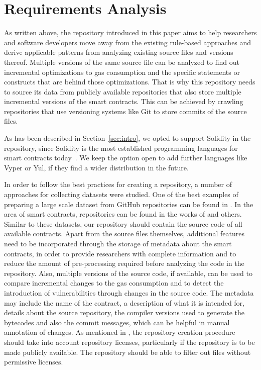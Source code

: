 \documentclass[10pt,conference]{IEEEtran}
\begin{document}
	
	
	
	\section{Requirements Analysis}
	\label{sec:requirements}
	As written above, the repository introduced in this paper aims to help researchers and software developers move away from the existing rule-based approaches and derive applicable patterns from analyzing existing source files and versions thereof. Multiple versions of the same source file can be analyzed to find out incremental optimizations to gas consumption and the specific statements or constructs that are behind those optimizations. That is why this repository needs to source its data from publicly available repositories that also store multiple incremental versions of the smart contracts. This can be achieved by crawling repositories that use versioning systems like Git to store commits of the source files.  
	
	As has been described in Section~\ref{sec:intro}, we opted to support Solidity in the repository, since Solidity is the most established programming languages for smart contracts today~\cite{soliditycheck}. We keep the option open to add further languages like Vyper or Yul, if they find a wider distribution in the future. 
	
	In order to follow the best practices for creating a repository, a number of approaches for collecting datasets were studied. One of the best examples of preparing a large scale dataset from GitHub repositories can be found in \cite{thestack}. In the area of smart contracts, repositories can be found in the works of \cite{renrepo} \cite{ferreirarepo} and others. Similar to these datasets, our repository should contain the source code of all available contracts. Apart from the source files themselves, additional features need to be incorporated through the storage of metadata about the smart contracts, in order to provide researchers with complete information and to reduce the amount of pre-processing required before analyzing the code in the repository. Also, multiple versions of the source code, if available, can be used to compare incremental changes to the gas consumption and to detect the introduction of vulnerabilities through changes in the source code. The metadata may include the name of the contract, a description of what it is intended for, details about the source repository, the compiler versions used to generate the bytecodes and also the commit messages, which can be helpful in manual annotation of changes. As mentioned in \cite{thestack}, the repository creation procedure should take into account repository licenses, particularly if the repository is to be made publicly available. The repository should be able to filter out files without permissive licenses.
	
\end{document}
